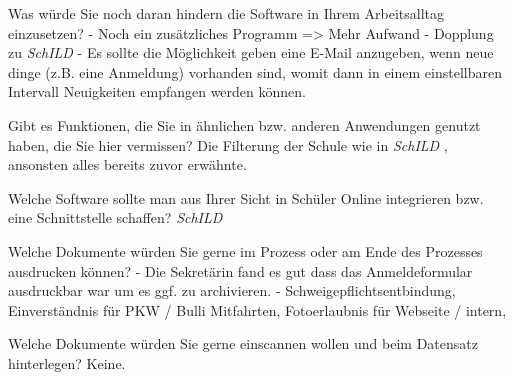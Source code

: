 Was würde Sie noch daran hindern die Software in Ihrem Arbeitsalltag einzusetzen?	
- Noch ein zusätzliches Programm => Mehr Aufwand 
- Dopplung zu \textit{SchILD} 
- Es sollte die Möglichkeit geben eine E-Mail anzugeben, wenn neue dinge (z.B. eine Anmeldung) vorhanden sind, womit dann in einem einstellbaren Intervall Neuigkeiten empfangen werden können.	
		












Gibt es Funktionen, die Sie in ähnlichen bzw. anderen Anwendungen genutzt haben, die Sie hier vermissen?
Die Filterung der Schule wie in  \textit{SchILD} , ansonsten alles bereits zuvor erwähnte.	







Welche Software sollte man aus Ihrer Sicht in Schüler Online integrieren bzw. eine Schnittstelle schaffen? 	
 \textit{SchILD} 	





Welche Dokumente würden Sie gerne im Prozess oder am Ende des Prozesses ausdrucken können?
- Die Sekretärin fand es gut dass das Anmeldeformular ausdruckbar war um es ggf. zu archivieren.
- Schweigepflichtsentbindung, Einverständnis für PKW / Bulli Mitfahrten, Fotoerlaubnis für Webseite / intern, 

Welche Dokumente würden Sie gerne einscannen wollen und beim Datensatz hinterlegen?
Keine.	
